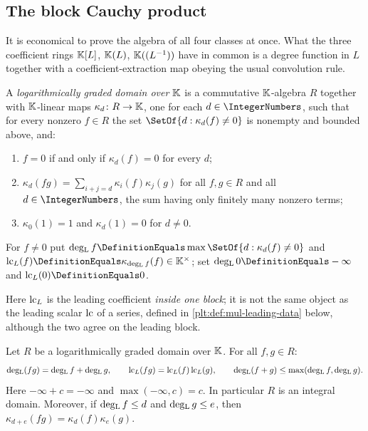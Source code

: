 \subsection{The block Cauchy product}
\label{plt:sec:mul-cauchy}

It is economical to prove the algebra of all four classes at once.  What the
three coefficient rings $\mathbb{K}[L]$, $\mathbb{K}(L)$, $\mathbb{K}((L^{-1}))$ have in common is a
degree function in $L$ together with a coefficient-extraction map obeying the
usual convolution rule.

\begin{definition}
\label{plt:def:mul-graded-domain}
A \emph{logarithmically graded domain over $\mathbb{K}$} is a commutative
$\mathbb{K}$-algebra $R$ together with $\mathbb{K}$-linear maps
$\kappa_d\colon R\to\mathbb{K}$, one for each $d\in\IntegerNumbers$, such that
for every nonzero $f\in R$ the set $\SetOf{d:\kappa_d(f)\ne0}$ is nonempty
and bounded above, and:
\begin{enumerate}
\item[(G1)] $f=0$ if and only if $\kappa_d(f)=0$ for every $d$;
\item[(G2)] $\kappa_d(fg)=\sum_{i+j=d}\kappa_i(f)\kappa_j(g)$ for all
$f,g\in R$ and all $d\in\IntegerNumbers$, the sum having only finitely many
nonzero terms;
\item[(G3)] $\kappa_0(1)=1$ and $\kappa_d(1)=0$ for $d\ne0$.
\end{enumerate}
For $f\ne0$ put $\degL f\DefinitionEquals\max\SetOf{d:\kappa_d(f)\ne0}$ and
$\lc_L(f)\DefinitionEquals\kappa_{\degL f}(f)\in\K^\times$; set
$\degL 0\DefinitionEquals-\infty$ and $\lc_L(0)\DefinitionEquals0$.
\end{definition}

Here $\operatorname{lc}_L$ is the leading coefficient \emph{inside one block}; it is not
the same object as the leading scalar $\operatorname{lc}$ of a series, defined in
\cref{plt:def:mul-leading-data} below, although the two agree on the leading
block.

\begin{lemma}
\label{plt:lem:mul-graded-basics}
Let $R$ be a logarithmically graded domain over $\mathbb{K}$.  For all $f,g\in R$:
\begin{equation}\label{plt:eq:mul-degL-laws}
 \operatorname{deg_{L}}(fg)=\operatorname{deg_{L}} f+\operatorname{deg_{L}} g,
 \qquad
 \operatorname{lc}_L(fg)=\operatorname{lc}_L(f)\operatorname{lc}_L(g),
 \qquad
 \operatorname{deg_{L}}(f+g)\le\max(\operatorname{deg_{L}} f,\operatorname{deg_{L}} g).
\end{equation}
Here $-\infty+c=-\infty$ and $\max(-\infty,c)=c$.  In particular $R$ is an
integral domain.  Moreover, if $\operatorname{deg_{L}} f\le d$ and $\operatorname{deg_{L}} g\le e$, then
$\kappa_{d+e}(fg)=\kappa_d(f)\kappa_e(g)$.
\end{lemma}

